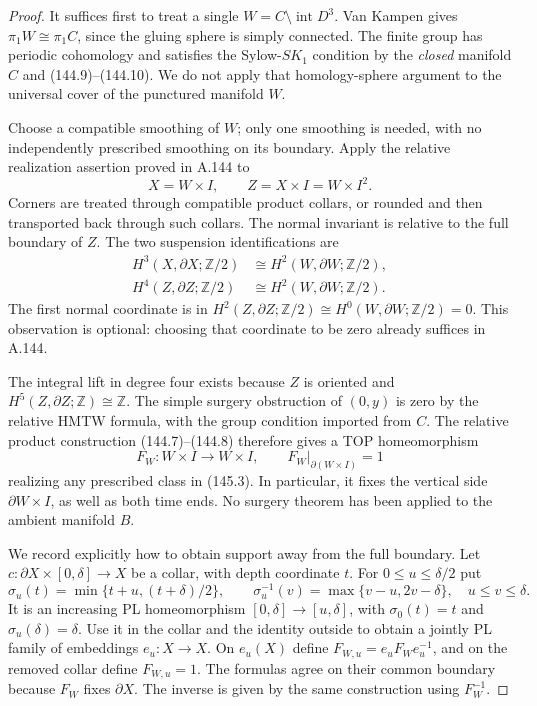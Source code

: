 \begin{proof}
It suffices first to treat a single $W=C\setminus\operatorname{int}D^3$.
Van Kampen gives $\pi_1W\cong\pi_1C$, since the gluing sphere is simply
connected. The finite group has periodic cohomology and satisfies
the Sylow-$SK_1$ condition by the \emph{closed} manifold $C$ and
(144.9)--(144.10). We do not apply that homology-sphere argument to
the universal cover of the punctured manifold $W$.

Choose a compatible smoothing of $W$; only one smoothing is needed,
with no independently prescribed smoothing on its boundary. Apply
the relative realization assertion proved in A.144 to
\[
       X=W\times I,\qquad Z=X\times I=W\times I^2.
\]
Corners are treated through compatible product collars, or rounded
and then transported back through such collars. The normal invariant
is relative to the full boundary of $Z$. The two suspension
identifications are
\[
 \begin{aligned}
 H^3(X,\partial X;\mathbb Z/2)
          &\cong H^2(W,\partial W;\mathbb Z/2),\\
 H^4(Z,\partial Z;\mathbb Z/2)
          &\cong H^2(W,\partial W;\mathbb Z/2).
 \end{aligned}
 \tag{145.3}
\]
The first normal coordinate is in
$H^2(Z,\partial Z;\mathbb Z/2)\cong
 H^0(W,\partial W;\mathbb Z/2)=0$.
This observation is optional: choosing that coordinate to be zero
already suffices in A.144.

The integral lift in degree four exists because $Z$ is oriented and
$H^5(Z,\partial Z;\mathbb Z)\cong\mathbb Z$. The simple surgery
obstruction of $(0,y)$ is zero by the relative HMTW formula, with
the group condition imported from $C$. The relative product
construction (144.7)--(144.8) therefore gives a TOP homeomorphism
\[
 F_W:W\times I\longrightarrow W\times I,\qquad
                  F_W|_{\partial(W\times I)}=1
 \tag{145.4}
\]
realizing any prescribed class in (145.3). In particular, it fixes
the vertical side $\partial W\times I$, as well as both time ends.
No surgery theorem has been applied to the ambient manifold $B$.

We record explicitly how to obtain support away from the full
boundary. Let $c:\partial X\times[0,\delta]\to X$ be a collar, with
depth coordinate $t$. For $0\le u\le\delta/2$ put
\[
 \sigma_u(t)=\min\{t+u,(t+\delta)/2\},\qquad
 \sigma_u^{-1}(v)=\max\{v-u,2v-\delta\},
       \quad u\le v\le\delta.
 \tag{145.5}
\]
It is an increasing PL homeomorphism $[0,\delta]\to[u,\delta]$,
with $\sigma_0(t)=t$ and $\sigma_u(\delta)=\delta$.
Use it in the collar and the identity outside to obtain a jointly
PL family of embeddings $e_u:X\to X$. On $e_u(X)$ define
$F_{W,u}=e_uF_We_u^{-1}$, and on the removed collar define
$F_{W,u}=1$. The formulas agree on their common boundary because
$F_W$ fixes $\partial X$. The inverse is given by the same
construction using $F_W^{-1}$.


\end{proof}
